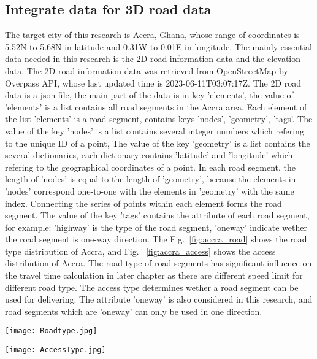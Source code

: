\documentclass[final-report]{report-template}
\begin{document}
\subsection {Integrate data for 3D road data}
The target city of this research is Accra, Ghana, whose range of coordinates is 5.52N to 5.68N in latitude and 0.31W to 0.01E in longitude.
The mainly essential data needed in this research is the 2D road information data and the elevation data. 
The 2D road information data was retrieved from OpenStreetMap by Overpass API, whose last updated time is 2023-06-11T03:07:17Z.
The 2D road data is a json file, the main part of the data is in key 'elements', the value of 'elements' is a list contains all road segments in the Accra area.
Each element of the list 'elements' is a road segment, contains keys 'nodes', 'geometry', 'tags'. 
The value of the key 'nodes' is a list contains several integer numbers which refering to the unique ID of a point, 
The value of the key 'geometry' is a list contains the several dictionaries, each dictionary contains 'latitude' and 'longitude' which refering to the geographical coordinates of a point.
In each road segment, the length of 'nodes' is equal to the length of 'geometry', because the elements in 'nodes' correspond one-to-one with the elements in 'geometry' with the same index.
Connecting the series of points within each element forms the road segment.
The value of the key 'tags' contains the attribute of each road segment, for example: 'highway' is the type of the road segment, 'oneway' indicate wether the road segment is one-way direction.
The Fig.~\ref{fig:accra_road} shows the road type distribution of Accra, and Fig.~ \ref{fig:accra_access} shows the access distribution of Accra. 
The road type of road segments has significant influence on the travel time calculation in later chapter as there are different speed limit for different road type.
The access type determines wether a road segment can be used for delivering. The attribute 'oneway' is also considered in this research, and road segments which are 'oneway' can only be used in one direction.

\begin{figure*}[htbp]
    \centering
    \begin{minipage}[t]{0.48\textwidth}
    \centering
    \texttt{[image: Roadtype.jpg]}
    \caption{\label{fig:accra_road} The road types of Accra}
    \end{minipage}
    \begin{minipage}[t]{0.48\textwidth}
    \centering
    \texttt{[image: AccessType.jpg]}
    \caption{\label{fig:accra_access} The access types of Accra}
    \end{minipage}
\end{figure*}
\end{document}
